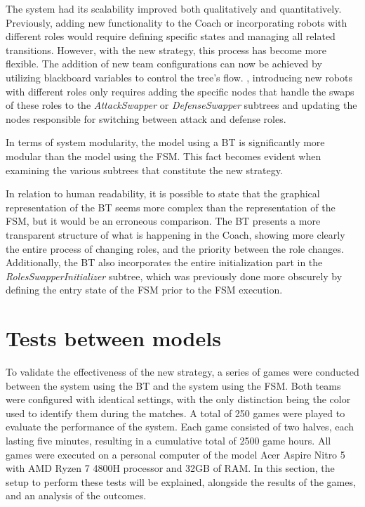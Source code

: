 The system had its scalability improved both qualitatively and quantitatively. Previously, adding new functionality to the Coach or incorporating robots with different roles would require defining specific states and managing all related transitions. However, with the new strategy, this process has become more flexible. The addition of new team configurations can now be achieved by utilizing blackboard variables to control the tree's flow. , introducing new robots with different roles only requires adding the specific nodes that handle the swaps of these roles to the \textit{AttackSwapper} or \textit{DefenseSwapper} subtrees and updating the nodes responsible for switching between attack and defense roles.

In terms of system modularity, the model using a BT is significantly more modular than the model using the FSM. This fact becomes evident when examining the various subtrees that constitute the new strategy.

In relation to human readability, it is possible to state that the graphical representation of the BT seems more complex than the representation of the FSM, but it would be an erroneous comparison. The BT presents a more transparent structure of what is happening in the Coach, showing more clearly the entire process of changing roles, and the priority between the role changes. Additionally, the BT also incorporates the entire initialization part in the \textit{RolesSwapperInitializer} subtree, which was previously done more obscurely by defining the entry state of the FSM prior to the FSM execution.

\section{Tests between models}

To validate the effectiveness of the new strategy, a series of games were conducted between the system using the BT and the system using the FSM. Both teams were configured with identical settings, with the only distinction being the color used to identify them during the matches. A total of 250 games were played to evaluate the performance of the system. Each game consisted of two halves, each lasting five minutes, resulting in a cumulative total of 2500 game hours. All games were executed on a personal computer of the model Acer Aspire Nitro 5 with AMD Ryzen 7 4800H processor and 32GB of RAM. In this section, the setup to perform these tests will be explained, alongside the results of the games, and an analysis of the outcomes.

